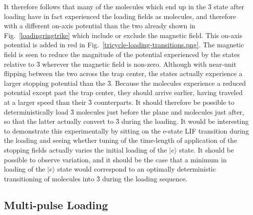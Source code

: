 It therefore follows that many of the molecules which end up in the \f3 state after loading have in fact experienced the loading fields as  molecules, and therefore with a different on-axis potential than the two already shown in Fig.~\ref{loadingringtrike} which include or exclude the magnetic field.
This on-axis potential is added in red in Fig.~\ref{tricycle-loading-transitions.png}.
The magnetic field is seen to reduce the magnitude of the potential experienced by the  states relative to \f3 wherever the magnetic field is non-zero. 
Although with near-unit flipping between the two across the trap center, the  states actually experience a larger stopping potential than the \f3.
Because the  molecules experience a reduced potential except past the trap center, they should arrive earlier, having traveled at a larger speed than their \f3 counterparts.
It should therefore be possible to deterministically load \f3 molecules just before the plane and  molecules just after, so that the latter actually convert to \f3 during the loading.
It would be interesting to demonstrate this experimentally by sitting on the e-state LIF transition during the loading and seeing whether tuning of the time-length of application of the stopping fields actually varies the initial loading of the $|e\rangle$ state.
It should be possible to observe variation, and it should be the case that a minimum in loading of the $|e\rangle$ state would correspond to an optimally deterministic transitioning of  molecules into \f3 during the loading sequence.


\subsection{Multi-pulse Loading}

